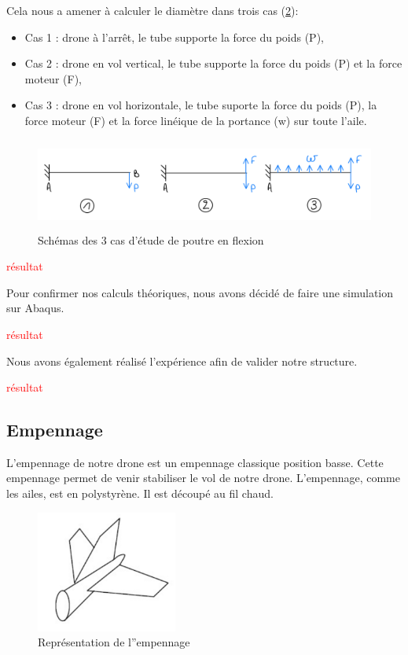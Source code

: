 \documentclass[a4paper,12pt,french]{report}
\begin{document}
Cela nous a amener à calculer le diamètre dans trois cas (\ref{flex}):
\begin{itemize}
    \item Cas 1 : drone à l'arrêt, le tube supporte la force du poids (P),
    \item Cas 2 : drone en vol vertical, le tube supporte la force du poids (P) et la force moteur (F),
    \item Cas 3 : drone en vol horizontale, le tube suporte la force du poids (P), la force moteur (F) et la force linéique de la portance (w) sur toute l'aile.
\end{itemize}

\begin{figure}[h]
    \centering
    \includegraphics[height=3cm]{figures/flexion.jpeg}
    \caption{Schémas des 3 cas d'étude de poutre en flexion}
    \label{flex}
\end{figure}

\textcolor{red}{résultat}

Pour confirmer nos calculs théoriques, nous avons décidé de faire une simulation sur Abaqus.\newline

\textcolor{red}{résultat}

Nous avons également réalisé l'expérience afin de valider notre structure.\newline

\textcolor{red}{résultat}


\subsection{Empennage}

L'empennage de notre drone est un empennage classique position basse. Cette empennage permet de venir stabiliser le vol de notre drone. L'empennage, comme les ailes, est en polystyrène. Il est découpé au fil chaud.

\begin{figure}[h]
    \centering
    \includegraphics[height=4cm]{figures/emp.jpeg}
    \caption{Représentation de l''empennage}
    \label{flex}
\end{figure}
\end{document}
